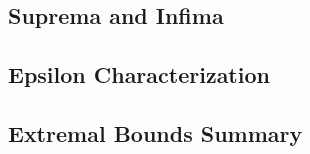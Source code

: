 \subsection*{Suprema and Infima}


\subsection*{Epsilon Characterization}


\subsection*{Extremal Bounds Summary}

